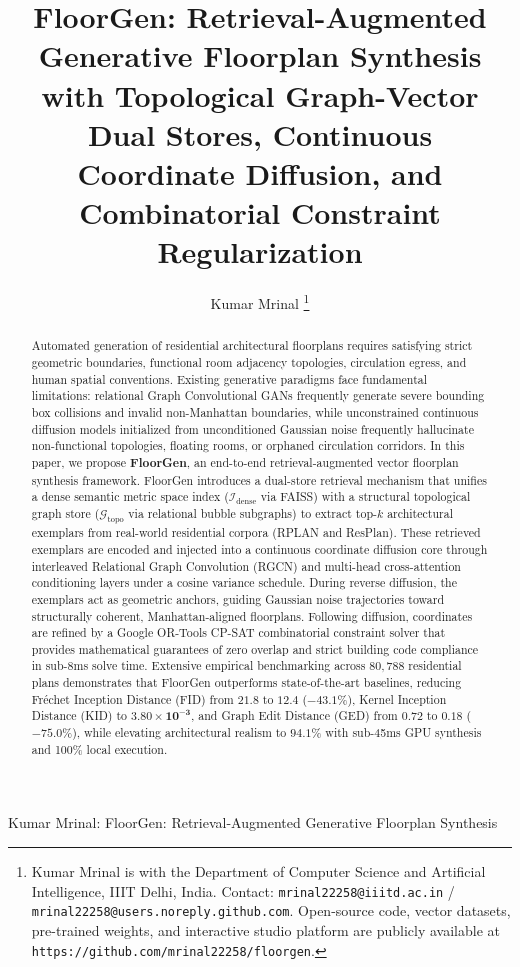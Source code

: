 \documentclass[journal]{IEEEtran}
\begin{document}
\title{FloorGen: Retrieval-Augmented Generative Floorplan Synthesis with Topological Graph-Vector Dual Stores, Continuous Coordinate Diffusion, and Combinatorial Constraint Regularization}

\author{Kumar Mrinal%
\thanks{Kumar Mrinal is with the Department of Computer Science and Artificial Intelligence, IIIT Delhi, India. Contact: \texttt{mrinal22258@iiitd.ac.in} / \texttt{mrinal22258@users.noreply.github.com}. Open-source code, vector datasets, pre-trained weights, and interactive studio platform are publicly available at \texttt{https://github.com/mrinal22258/floorgen}.}}

%
{Kumar Mrinal: FloorGen: Retrieval-Augmented Generative Floorplan Synthesis}

\maketitle

\begin{abstract}
Automated generation of residential architectural floorplans requires satisfying strict geometric boundaries, functional room adjacency topologies, circulation egress, and human spatial conventions. Existing generative paradigms face fundamental limitations: relational Graph Convolutional GANs frequently generate severe bounding box collisions and invalid non-Manhattan boundaries, while unconstrained continuous diffusion models initialized from unconditioned Gaussian noise frequently hallucinate non-functional topologies, floating rooms, or orphaned circulation corridors. In this paper, we propose \textbf{FloorGen}, an end-to-end retrieval-augmented vector floorplan synthesis framework. FloorGen introduces a dual-store retrieval mechanism that unifies a dense semantic metric space index ($\mathcal{I}_{\mathrm{dense}}$ via FAISS) with a structural topological graph store ($\mathcal{G}_{\mathrm{topo}}$ via relational bubble subgraphs) to extract top-$k$ architectural exemplars from real-world residential corpora (RPLAN and ResPlan). These retrieved exemplars are encoded and injected into a continuous coordinate diffusion core through interleaved Relational Graph Convolution (RGCN) and multi-head cross-attention conditioning layers under a cosine variance schedule. During reverse diffusion, the exemplars act as geometric anchors, guiding Gaussian noise trajectories toward structurally coherent, Manhattan-aligned floorplans. Following diffusion, coordinates are refined by a Google OR-Tools CP-SAT combinatorial constraint solver that provides mathematical guarantees of zero overlap and strict building code compliance in sub-8ms solve time. Extensive empirical benchmarking across $80{,}788$ residential plans demonstrates that FloorGen outperforms state-of-the-art baselines, reducing Fréchet Inception Distance (FID) from $21.8$ to $\mathbf{12.4}$ ($-43.1\%$), Kernel Inception Distance (KID) to $\mathbf{3.80 \times 10^{-3}}$, and Graph Edit Distance (GED) from $0.72$ to $\mathbf{0.18}$ ($-75.0\%$), while elevating architectural realism to $\mathbf{94.1\%}$ with sub-45ms GPU synthesis and 100\% local execution.
\end{abstract}
\end{document}
